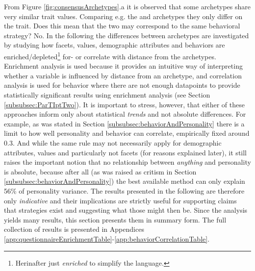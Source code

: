 From Figure \ref{fig:consensusArchetypes}.a it is observed that some archetypes share very similar trait values.
Comparing e.g. the \host and \follower archetypes they only differ on the \EXT trait.
Does this mean that the two may correspond to the same behavioral strategy? No.
In the following the differences between archetypes are investigated by studying how facets, values, demographic attributes and behaviors are enriched/depleted\footnote{Herinafter just \textit{enriched} to simplify the language.} for- or correlate with distance from the archetypes.
Enrichment analysis is used because it provides an intuitive way of interpreting whether a variable is influenced by distance from an archetype, and correlation analysis is used for behavior where there are not enough datapoints to provide statistically significant results using enrichment analysis (see Section \ref{subsubsec:ParTIptTwo}).
It is important to stress, however, that either of these approaches inform only about statistical \textit{trends} and not absolute differences.
For example, as was stated in Section \ref{subsubsec:behaviorAndPersonality} there is a limit to how well personality and behavior can correlate, empirically fixed around 0.3.
And while the same rule may not necessarily apply for demographic attributes, values and particularly not facets (for reasons explained later), it still raises the important notion that no relationship between \textit{anything} and personality is absolute, because after all (as was raised as critism in Section \ref{subsubsec:behaviorAndPersonality}) the best available method can only explain 56\% of personality variance.
The results presented in the following are therefore only \textit{indicative} and their implications are strictly useful for supporting claims that strategies exist and suggesting what those might then be.
Since the analysis yields many results, this section presents them in summary form.
The full collection of results is presented in Appendices \ref{app:questionnaireEnrichmentTable}-\ref{app:behaviorCorrelationTable}.


